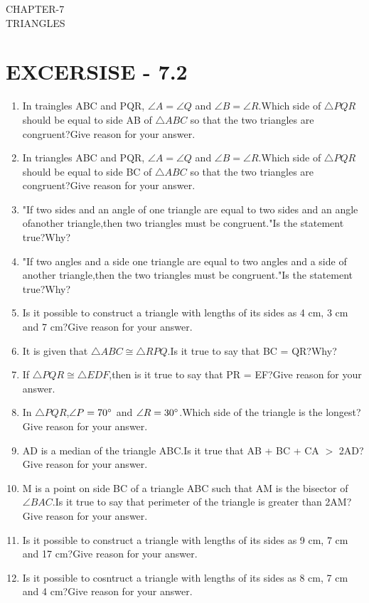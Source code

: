 \documentclass[12pt]{article}
\begin{document}
\begin{center}
\textbf\large{CHAPTER-7  \\  TRIANGLES}
\section*{EXCERSISE - 7.2}
\end{center}

\begin{enumerate}

\item In traingles ABC and PQR, $ \angle{A} = \angle{Q} $ and $ \angle{B} = \angle{R} $.Which side of $ \triangle{PQR} $ should be equal to side AB of $ \triangle{ABC} $ so that the two triangles are congruent?Give reason for your answer.

\item In triangles ABC and PQR, $ \angle{A} = \angle{Q} $ and $ \angle{B} = \angle{R} $.Which side of $ \triangle{PQR} $should be equal to side BC of $ \triangle{ABC} $ so that the two triangles are congruent?Give reason for your answer.

\item "If two sides and an angle of one triangle are equal to two sides and an angle ofanother triangle,then two triangles must be congruent."Is the statement true?Why?

\item "If two angles and a side one triangle are equal to two angles and a side of another triangle,then the two triangles must be congruent."Is the statement true?Why?

\item Is it possible to construct a triangle with lengths of its sides as 4 cm, 3 cm and 7 cm?Give reason for your answer.

\item It is given that $ \triangle{ABC} \cong \triangle{RPQ} $.Is it true to say that BC = QR?Why?

\item If $ \triangle{PQR} \cong \triangle{EDF} $,then is it true to say that PR = EF?Give reason for your answer.

\item In $ \triangle{PQR} $,$ \angle{P} = 70\degree $ and $ \angle{R} = 30\degree $.Which side of the triangle is the longest?Give reason for your answer.

\item AD is a median of the triangle ABC.Is it true that AB + BC + CA $ > $ 2AD?Give reason for your answer.

\item M is a point on side BC of a triangle ABC such that AM is the bisector of $ \angle{BAC} $.Is it true to say that perimeter of the triangle is greater than 2AM?Give reason for your answer.

\item Is it possible to construct a triangle with lengths of its sides as 9 cm, 7 cm and 17 cm?Give reason for your answer.

\item Is it possible to cosntruct a triangle with lengths of its sides as 8 cm, 7 cm and 4 cm?Give reason for your answer.

\end{enumerate}
\end{document}
